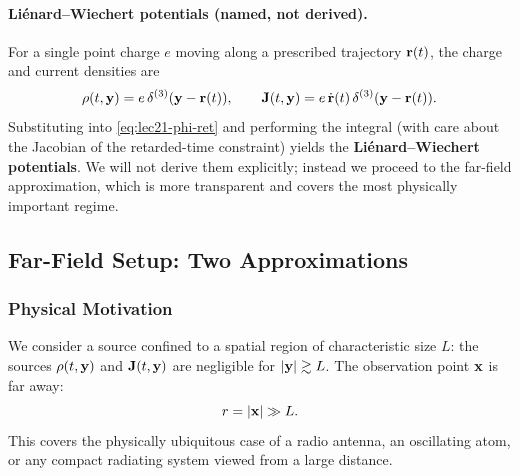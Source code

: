 \paragraph{Liénard--Wiechert potentials (named, not derived).}
For a single point charge $e$ moving along a prescribed trajectory $\mathbf{r}(t)$, the
charge and current densities are
\[
  \rho(t,\mathbf{y}) = e\,\delta^{(3)}(\mathbf{y}-\mathbf{r}(t)),
  \qquad
  \mathbf{J}(t,\mathbf{y}) = e\,\dot{\mathbf{r}}(t)\,\delta^{(3)}(\mathbf{y}-\mathbf{r}(t)).
\]
Substituting into \eqref{eq:lec21-phi-ret} and performing the integral (with care about
the Jacobian of the retarded-time constraint) yields the
\textbf{Liénard--Wiechert potentials}. We will not derive them explicitly; instead we
proceed to the far-field approximation, which is more transparent and covers the most
physically important regime.


\subsection{Far-Field Setup: Two Approximations}
\label{subsec:lec21-farfield-setup}

\subsubsection*{Physical Motivation}
We consider a source confined to a spatial region of characteristic size $L$: the
sources $\rho(t,\mathbf{y})$ and $\mathbf{J}(t,\mathbf{y})$ are negligible for
$|\mathbf{y}|\gtrsim L$. The observation point $\mathbf{x}$ is far away:
\begin{equation}\label{eq:lec21-farfield-geo}
  r = |\mathbf{x}| \gg L.
\end{equation}
This covers the physically ubiquitous case of a radio antenna, an oscillating atom, or
any compact radiating system viewed from a large distance.

